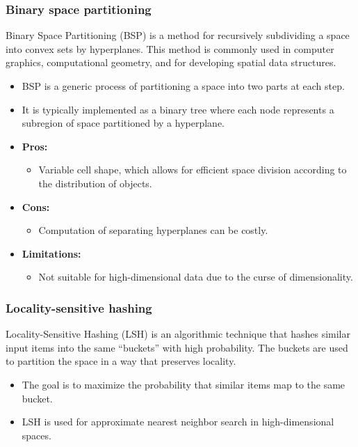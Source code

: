 \documentclass[12pt]{article}
\begin{document}
\subsubsection{Binary space partitioning}
Binary Space Partitioning (BSP) is a method for recursively subdividing a space into convex sets by hyperplanes. This method is commonly used in computer graphics, computational geometry, and for developing spatial data structures.

\begin{itemize}
    \item BSP is a generic process of partitioning a space into two parts at each step.
    \item It is typically implemented as a binary tree where each node represents a subregion of space partitioned by a hyperplane.
\end{itemize}

\begin{itemize}
    \item \textbf{Pros:}
    \begin{itemize}
        \item Variable cell shape, which allows for efficient space division according to the distribution of objects.
    \end{itemize}
    \item \textbf{Cons:}
    \begin{itemize}
        \item Computation of separating hyperplanes can be costly.
    \end{itemize}
    \item \textbf{Limitations:}
    \begin{itemize}
        \item Not suitable for high-dimensional data due to the curse of dimensionality.
    \end{itemize}
\end{itemize}


\subsubsection{Locality-sensitive hashing}
Locality-Sensitive Hashing (LSH) is an algorithmic technique that hashes similar input items into the same “buckets” with high probability. The buckets are used to partition the space in a way that preserves locality.

\begin{itemize}
    \item The goal is to maximize the probability that similar items map to the same bucket.
    \item LSH is used for approximate nearest neighbor search in high-dimensional spaces.
\end{itemize}
\end{document}
